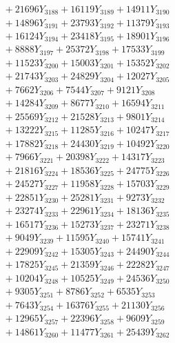 \documentclass[a4paper,10pt]{article}
\begin{document}
{\begin{align}
&\;  + 21696 Y_{3188} + 16119 Y_{3189} + 14911 Y_{3190} \\[0.3ex]
&\;  + 14896 Y_{3191} + 23793 Y_{3192} + 11379 Y_{3193} \\[0.3ex]
&\;  + 16124 Y_{3194} + 23418 Y_{3195} + 18901 Y_{3196} \\[0.3ex]
&\;  + 8888 Y_{3197} + 25372 Y_{3198} + 17533 Y_{3199} \\[0.3ex]
&\;  + 11523 Y_{3200} + 15003 Y_{3201} + 15352 Y_{3202} \\[0.3ex]
&\;  + 21743 Y_{3203} + 24829 Y_{3204} + 12027 Y_{3205} \\[0.3ex]
&\;  + 7662 Y_{3206} + 7544 Y_{3207} + 9121 Y_{3208} \\[0.5ex]\allowbreak
&\;  + 14284 Y_{3209} + 8677 Y_{3210} + 16594 Y_{3211} \\[0.3ex]
&\;  + 25569 Y_{3212} + 21528 Y_{3213} + 9801 Y_{3214} \\[0.3ex]
&\;  + 13222 Y_{3215} + 11285 Y_{3216} + 10247 Y_{3217} \\[0.3ex]
&\;  + 17882 Y_{3218} + 24430 Y_{3219} + 10492 Y_{3220} \\[0.3ex]
&\;  + 7966 Y_{3221} + 20398 Y_{3222} + 14317 Y_{3223} \\[0.3ex]
&\;  + 21816 Y_{3224} + 18536 Y_{3225} + 24775 Y_{3226} \\[0.3ex]
&\;  + 24527 Y_{3227} + 11958 Y_{3228} + 15703 Y_{3229} \\[0.3ex]
&\;  + 22851 Y_{3230} + 25281 Y_{3231} + 9273 Y_{3232} \\[0.3ex]
&\;  + 23274 Y_{3233} + 22961 Y_{3234} + 18136 Y_{3235} \\[0.3ex]
&\;  + 16517 Y_{3236} + 15273 Y_{3237} + 23271 Y_{3238} \\[0.5ex]\allowbreak
&\;  + 9049 Y_{3239} + 11595 Y_{3240} + 15741 Y_{3241} \\[0.3ex]
&\;  + 22909 Y_{3242} + 15305 Y_{3243} + 24490 Y_{3244} \\[0.3ex]
&\;  + 17825 Y_{3245} + 21359 Y_{3246} + 22282 Y_{3247} \\[0.3ex]
&\;  + 10204 Y_{3248} + 10525 Y_{3249} + 24536 Y_{3250} \\[0.3ex]
&\;  + 9305 Y_{3251} + 8786 Y_{3252} + 6535 Y_{3253} \\[0.3ex]
&\;  + 7643 Y_{3254} + 16376 Y_{3255} + 21130 Y_{3256} \\[0.3ex]
&\;  + 12965 Y_{3257} + 22396 Y_{3258} + 9609 Y_{3259} \\[0.3ex]
&\;  + 14861 Y_{3260} + 11477 Y_{3261} + 25439 Y_{3262} \\[0.3ex]

\end{align}}
\end{document}

